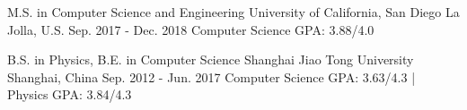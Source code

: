 


\begin{cventries}


\cventry
{M.S. in Computer Science and Engineering} %
{University of California, San Diego} %
{La Jolla, U.S.} %
{Sep. 2017 - Dec. 2018} %
{Computer Science GPA: 3.88/4.0}


\cventry
{B.S. in Physics, B.E. in Computer Science} %
{Shanghai Jiao Tong University} %
{Shanghai, China} %
{Sep. 2012 - Jun. 2017} %
{Computer Science GPA: 3.63/4.3 \hspace{.1cm} | \hspace{.1cm} Physics GPA: 3.84/4.3}


\end{cventries}
